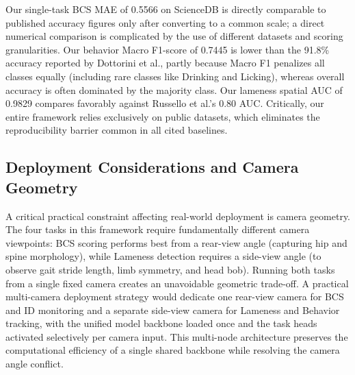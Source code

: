 \begin{table}[H]
\centering
\caption{Comparison of key task results against relevant published literature.}
\label{tab:sota_comparison}
\end{table}

Our single-task BCS MAE of 0.5566 on ScienceDB is directly comparable to published accuracy figures only after converting to a common scale; a direct numerical comparison is complicated by the use of different datasets and scoring granularities. Our behavior Macro F1-score of 0.7445 is lower than the 91.8\% accuracy reported by Dottorini et al., partly because Macro F1 penalizes all classes equally (including rare classes like Drinking and Licking), whereas overall accuracy is often dominated by the majority class. Our lameness spatial AUC of 0.9829 compares favorably against Russello et al.'s 0.80 AUC. Critically, our entire framework relies exclusively on public datasets, which eliminates the reproducibility barrier common in all cited baselines.

\subsection{Deployment Considerations and Camera Geometry}
A critical practical constraint affecting real-world deployment is camera geometry. The four tasks in this framework require fundamentally different camera viewpoints: BCS scoring performs best from a rear-view angle (capturing hip and spine morphology), while Lameness detection requires a side-view angle (to observe gait stride length, limb symmetry, and head bob). Running both tasks from a single fixed camera creates an unavoidable geometric trade-off. A practical multi-camera deployment strategy would dedicate one rear-view camera for BCS and ID monitoring and a separate side-view camera for Lameness and Behavior tracking, with the unified model backbone loaded once and the task heads activated selectively per camera input. This multi-node architecture preserves the computational efficiency of a single shared backbone while resolving the camera angle conflict.

